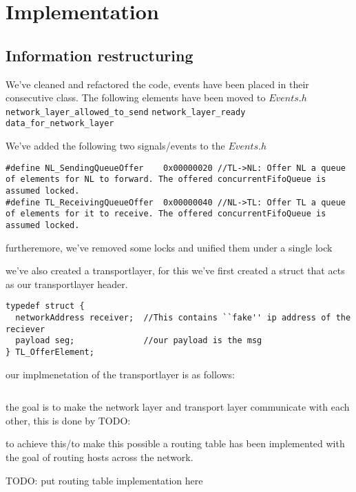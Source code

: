 \section{Implementation}
\subsection{Information restructuring}

We've cleaned and refactored the code, events have been placed in their consecutive class.
The following elements have been moved to $Events.h$
\\
\texttt{network\_layer\_allowed\_to\_send}
\break
\texttt{network\_layer\_ready}
\break
\texttt{data\_for\_network\_layer}
\break

We've added the following two signals/events to the $Events.h$

\begin{lstlisting}
#define NL_SendingQueueOffer    0x00000020 //TL->NL: Offer NL a queue of elements for NL to forward. The offered concurrentFifoQueue is assumed locked.
#define TL_ReceivingQueueOffer  0x00000040 //NL->TL: Offer TL a queue of elements for it to receive. The offered concurrentFifoQueue is assumed locked.
\end{lstlisting}

furtheremore, we've removed some locks and unified them under a single lock


we've also created a transportlayer, for this we've first created a struct that acts as our transportlayer header.


\begin{lstlisting}
typedef struct {
  networkAddress receiver;  //This contains ``fake'' ip address of the reciever
  payload seg;              //our payload is the msg
} TL_OfferElement;
\end{lstlisting}

our implmenetation of the transportlayer is as follows:

\begin{lstlisting}
\end{lstlisting}

the goal is to make the network layer and transport layer communicate with each other, this is done by TODO:


to achieve this/to make this possible a routing table has been implemented with the goal of routing hosts across the network.

TODO: put routing table implementation here

